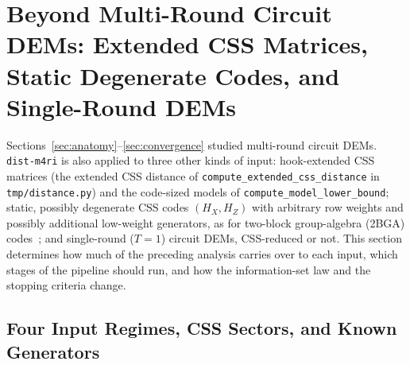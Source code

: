 \documentclass[12pt]{article}
\theoremstyle{definition}
\newcommand{\ttt}[1]{\texttt{#1}}
\begin{document}
\section{Beyond Multi-Round Circuit DEMs: Extended CSS Matrices, Static Degenerate Codes, and Single-Round
  DEMs}\label{sec:regimes}

Sections~\ref{sec:anatomy}--\ref{sec:convergence} studied multi-round circuit DEMs. \ttt{dist-m4ri} is also applied
to three other kinds of input: hook-extended CSS matrices (the extended CSS distance of
\ttt{compute\_extended\_css\_distance} in \ttt{tmp/distance.py}) and the code-sized models of
\ttt{compute\_model\_lower\_bound}; static, possibly degenerate CSS codes $(H_X, H_Z)$ with arbitrary row weights and
possibly additional low-weight generators, as for two-block group-algebra (2BGA)
codes~\cite{LinPryadko2024,Lee2026BicycleRace}; and single-round ($T = 1$) circuit DEMs, CSS-reduced or not. This
section determines how much of the preceding analysis carries over to each input, which stages of the pipeline should
run, and how the information-set law and the stopping criteria change.

\subsection{Four Input Regimes, CSS Sectors, and Known Generators}\label{subsec:regimes_overview}
\end{document}
